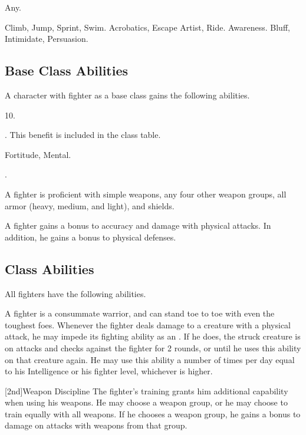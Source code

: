      Any.

     Climb, Jump, Sprint, Swim.
     Acrobatics, Escape Artist, Ride.
     Awareness.
     Bluff, Intimidate, Persuasion.

    \subsection{Base Class Abilities}
        A character with fighter as a base class gains the following abilities.

         10.

         . This benefit is included in the class table.

          Fortitude,  Mental.

         .

        A fighter is proficient with simple weapons, any four other weapon groups,  all armor (heavy, medium, and light), and shields.

        A fighter gains a  bonus to accuracy and damage with physical attacks.
        In addition, he gains a  bonus to physical defenses.

    \subsection{Class Abilities}
        All fighters have the following abilities.

        A fighter is a consummate warrior, and can stand toe to toe with even the toughest foes.
        Whenever the fighter deals damage to a creature with a physical attack, he may impede its fighting ability as an .
        If he does, the struck creature is \impaired on attacks and checks against the fighter for 2 rounds, or until he uses this ability on that creature again.
        He may use this ability a number of times per day equal to his Intelligence or his fighter level, whichever is higher.

        [2nd]{Weapon Discipline}
        The fighter's training grants him additional capability when using his weapons.
        He may choose a weapon group, or he may choose to train equally with all weapons.
        If he chooses a weapon group, he gains a  bonus to damage on attacks with weapons from that group.

